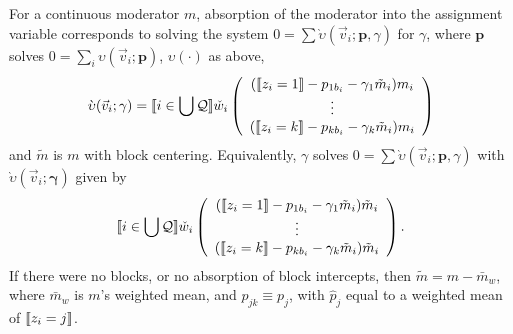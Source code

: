 \documentclass{article}
\DeclarePairedDelimiter{\indicator}{\llbracket}{\rrbracket}
\newcommand{\owt}[1][{[z_{i}]}]{\ensuremath{\check{w}_{i#1}}}
\newcommand{\absorbInterceptsEF}{\upsilon}
\newcommand{\absorbModeratorEF}{\grave{\upsilon}}
\begin{document}
For a continuous moderator $m$, absorption of the moderator into the assignment variable
corresponds to solving the system $0 = \sum
\absorbModeratorEF(\vec{v}_{i}; \mathbf{p},{\gamma})$ for
$\gamma$, where $\mathbf{p}$ solves $0 =
\sum_{i}\absorbInterceptsEF(\vec{v}_{i}; \mathbf{p})$,
$\absorbInterceptsEF(\cdot)$ as above, 
\begin{equation}
  \label{eq:18}
    \absorbModeratorEF(\vec{v}_{i}; \mathbf{\gamma})=
    \indicator{i \in \bigcup \mathcal{Q}} \owt[]
     \left(
       \begin{array}{c}
         (
         \indicator{z_{i}=1}-p_{1b_{i}}-\gamma_{1}
         \tilde{m}_{i}
         )m_{i} \\
         \vdots\\
         (\indicator{z_{i}=k}-p_{kb_{i}}
         - \gamma_{k} \tilde{m}_{i})m_{i}\\
       \end{array}
  \right)%
\end{equation}
and $\tilde{m}$ is $m$ with block centering. Equivalently, $\gamma$
solves $0 = \sum
\absorbModeratorEF(\vec{v}_{i}; \mathbf{p},{\gamma})$ with 
$\absorbModeratorEF(\vec{v}_{i}; \mathbf{\gamma})$ given by 
\begin{equation*}
    \indicator{i \in \bigcup \mathcal{Q}} \owt[]
     \left(
       \begin{array}{c}
         (\indicator{z_{i}=1}-p_{1b_{i}}-\gamma_{1}
         \tilde{m}_{i})\tilde{m}_{i} \\
         \vdots\\
         (\indicator{z_{i}=k}-p_{kb_{i}}
         - \gamma_{k} \tilde{m}_{i})\tilde{m}_{i}\\
       \end{array}
     \right).
\end{equation*}
If there were no blocks,
or no absorption of block intercepts, then $\tilde{m} = m -
\bar{m}_{w}$,  where $\bar{m}_{w}$ is $m$'s weighted mean, and $p_{jk}
\equiv p_{j}$, with $\hat{p}_{j}$ equal to a weighted mean of
$\indicator{z_{i}=j}$. 
\end{document}
